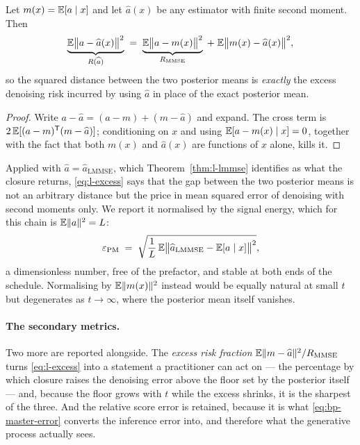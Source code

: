 \begin{proposition}\label{prop:l-excess}
Let $m(x) = \mathbb{E}[a\mid x]$ and let $\widehat a(x)$ be any estimator with finite
second moment. Then
\begin{equation}
  \underbrace{\mathbb{E}\big\|a - \widehat a(x)\big\|^2}_{R(\widehat a)}
  \;=\;
  \underbrace{\mathbb{E}\big\|a - m(x)\big\|^2}_{R_{\mathrm{MMSE}}}
  \;+\;
  \mathbb{E}\big\|m(x) - \widehat a(x)\big\|^2 ,
  \label{eq:l-excess}
\end{equation}
so the squared distance between the two posterior means is \emph{exactly} the
excess denoising risk incurred by using $\widehat a$ in place of the exact
posterior mean.
\end{proposition}

\begin{proof}
Write $a - \widehat a = (a - m) + (m - \widehat a)$ and expand. The cross term
is $2\,\mathbb{E}[(a-m)^{\mathsf{T}}(m-\widehat a)]$; conditioning on $x$ and using
$\mathbb{E}[a - m(x) \mid x] = 0$, together with the fact that both $m(x)$ and
$\widehat a(x)$ are functions of $x$ alone, kills it. \end{proof}

Applied with $\widehat a = \widehat a_{\mathrm{LMMSE}}$, which
Theorem~\ref{thm:l-lmmse} identifies as what the closure returns,
\eqref{eq:l-excess} says that the gap between the two posterior means is not
an arbitrary distance but the price in mean squared error of denoising with
second moments only. We report it normalised by the signal energy, which for
this chain is $\mathbb{E}\|a\|^2 = L$:
\begin{equation}
  \varepsilon_{\mathrm{PM}}
  \;=\;
  \sqrt{\frac{1}{L}\,
        \mathbb{E}\big\| \widehat a_{\mathrm{LMMSE}} - \mathbb{E}[a \mid x] \big\|^2 } ,
  \label{eq:l-epspm}
\end{equation}
a dimensionless number, free of the prefactor, and stable at both ends
of the schedule. Normalising by $\mathbb{E}\|m(x)\|^2$ instead would be equally
natural at small $t$ but degenerates as $t\to\infty$, where the posterior mean
itself vanishes.

\paragraph{The secondary metrics.} Two more are reported alongside. The
\emph{excess risk fraction} $\mathbb{E}\|m - \widehat a\|^2 / R_{\mathrm{MMSE}}$ turns
\eqref{eq:l-excess} into a statement a practitioner can act on --- the
percentage by which closure raises the denoising error above the floor set by
the posterior itself --- and, because the floor grows with $t$ while the excess
shrinks, it is the sharpest of the three. And the relative score error is
retained, because it is what \eqref{eq:bp-master-error} converts the inference
error into, and therefore what the generative process actually sees.

